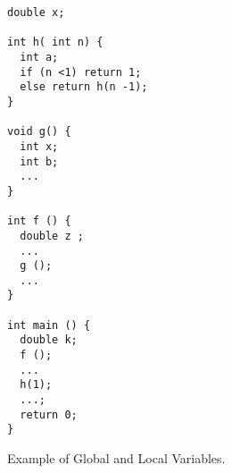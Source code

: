 \begin{multicols}{2}

\begin{listing}[H]

\begin{verbatim}
double x;

int h( int n) {
  int a;
  if (n <1) return 1;
  else return h(n -1);
}

void g() {
  int x;
  int b;
  ...
}

int f () {
  double z ;
  ...
  g ();
  ...
}

int main () {
  double k;
  f ();
  ...
  h(1);
  ...;
  return 0;
}
\end{verbatim}

\caption{Example of Global and Local Variables.}
\label{code:code-3}
  
\end{listing}

\columnbreak



\end{multicols}
